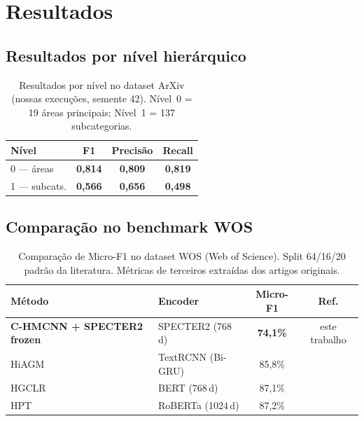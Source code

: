\documentclass[11pt,a4paper]{article}
\newcommand{\ours}[1]{\textcolor{ourcolor}{\textbf{#1}}}
\begin{document}
\section{Resultados}

\subsection{Resultados por nível hierárquico}

\begin{table}[ht]
\centering
\caption{Resultados por nível no dataset ArXiv (nossas execuções, semente 42).
         Nível~0 = 19 áreas principais; Nível~1 = 137 subcategorias.}
\label{tab:per_level}
\begin{tabular}{lccc}
\toprule
\textbf{Nível} & \textbf{F1} & \textbf{Precisão} & \textbf{Recall} \\
\midrule
0 --- áreas      & \ours{0,814} & \ours{0,809} & \ours{0,819} \\
1 --- subcats.   & \ours{0,566} & \ours{0,656} & \ours{0,498} \\
\bottomrule
\end{tabular}
\end{table}

\subsection{Comparação no benchmark WOS}

\begin{table}[ht]
\centering
\small
\caption{Comparação de Micro-F1 no dataset WOS (Web of Science).
         Split 64/16/20 padrão da literatura. Métricas de terceiros extraídas
         dos artigos originais.}
\label{tab:sota}
\begin{tabular}{llcc}
\toprule
\textbf{Método} & \textbf{Encoder} & \textbf{Micro-F1} & \textbf{Ref.} \\
\midrule
\ours{C-HMCNN + SPECTER2 frozen} & SPECTER2 (768\,d) & \ours{74,1\%} & este trabalho \\
\midrule
HiAGM \cite{zhou2020hiagm}    & TextRCNN (Bi-GRU) & 85,8\%  & \cite{zhou2020hiagm} \\
HGCLR \cite{wang2022hgclr}    & BERT (768\,d)     & 87,1\%  & \cite{wang2022hgclr} \\
HPT \cite{wang2022hpt}        & RoBERTa (1024\,d) & 87,2\%  & \cite{wang2022hpt} \\
\bottomrule
\end{tabular}
\end{table}
\end{document}
